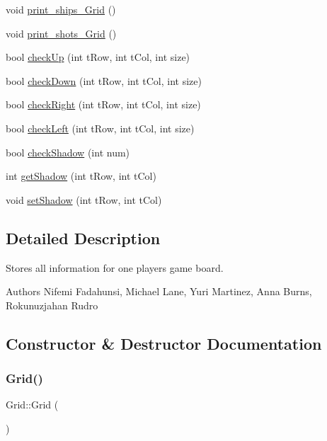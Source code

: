\begin{DoxyCompactItemize}
void \hyperlink{classGrid_a8ae0f29a39c8bb700a20d0e6e865b801}{print\+\_\+ships\+\_\+\+Grid} ()
\item 
void \hyperlink{classGrid_afddc50f6f34ad95f4f860c92fb7cf848}{print\+\_\+shots\+\_\+\+Grid} ()
\item 
bool \hyperlink{classGrid_a54f02f20686c6868a5083a2076af0c60}{check\+Up} (int t\+Row, int t\+Col, int size)
\item 
bool \hyperlink{classGrid_ad2eddab31788809b0a1d4a34f0410ddc}{check\+Down} (int t\+Row, int t\+Col, int size)
\item 
bool \hyperlink{classGrid_a89cf2bde3daca8d048a568e7ee6a9fa2}{check\+Right} (int t\+Row, int t\+Col, int size)
\item 
bool \hyperlink{classGrid_a92d3dec9998340992f02f26dbc5036df}{check\+Left} (int t\+Row, int t\+Col, int size)
\item 
bool \hyperlink{classGrid_a0dd2b56c03c9a55f52cc7a4d3e305c4e}{check\+Shadow} (int num)
\item 
int \hyperlink{classGrid_a3d7d6f2c79360af341ce1188ad70e390}{get\+Shadow} (int t\+Row, int t\+Col)
\item 
void \hyperlink{classGrid_ab04f98c62f74cbf487a49e535c38c93d}{set\+Shadow} (int t\+Row, int t\+Col)
\end{DoxyCompactItemize}


\subsection{Detailed Description}
Stores all information for one player\textquotesingle{}s game board. 

\begin{DoxyAuthor}{Authors}
Nifemi Fadahunsi, Michael Lane, Yuri Martinez, Anna Burns, Rokunuzjahan Rudro 
\end{DoxyAuthor}


\subsection{Constructor \& Destructor Documentation}
\mbox{\label{classGrid_a4ac9ff4f63552b4c61ff90fcb35ad66c}} 
\subsubsection{\texorpdfstring{Grid()}{Grid()}}
{\footnotesize\ttfamily Grid\+::\+Grid (\begin{DoxyParamCaption}{ }\end{DoxyParamCaption})}


